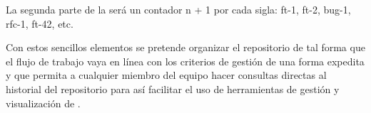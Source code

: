 La segunda parte de la  será un contador {n + 1} por cada sigla: ft-1, ft-2, bug-1, rfc-1, ft-42, etc.


Con estos sencillos elementos se pretende organizar el repositorio de tal forma que el flujo de trabajo vaya en línea con los criterios de gestión de una forma expedita y que permita a cualquier miembro del equipo hacer consultas directas al historial del repositorio para así facilitar el uso de herramientas de gestión y visualización de .
